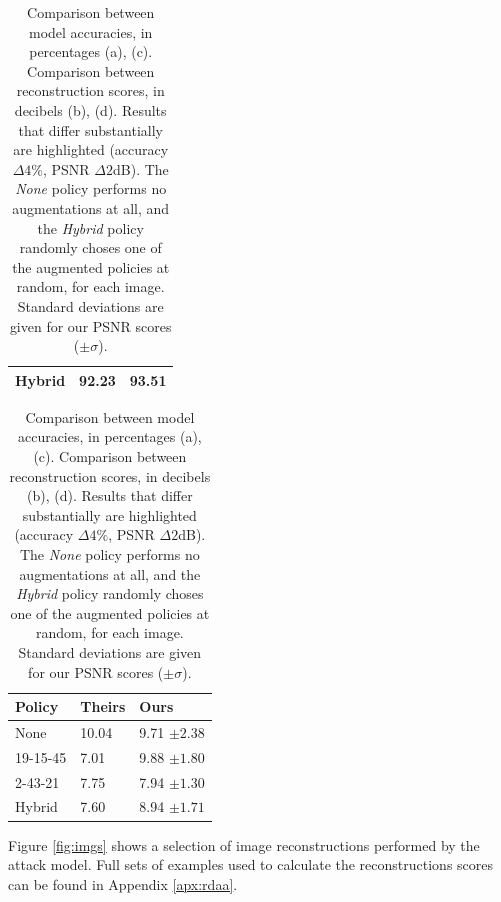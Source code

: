 \begin{table}[h]
\begin{subtable}{.50\linewidth}
{\begin{tabular}{|l|l l |}
             Hybrid          & 92.23           & 93.51         \\
             \hline
        \end{tabular}}
        \caption{Accuracy, F-Mnist}\label{tab:1b}
    \end{subtable}
    \hfill
    \begin{subtable}{.50\linewidth}
        \centering
        {\begin{tabular}{|l|l l|}
             \hline
             \textbf{Policy} & \textbf{Theirs}  & \textbf{Ours}               \\\hline
             None            & 10.04            & 9.71 $\pm 2.38$             \\
             19-15-45        & \color{red} 7.01 & \color{red}  9.88  $\pm 1.80$   \\
             2-43-21         & 7.75             & 7.94 $\pm  1.30$              \\
             Hybrid          & \color{red} 7.60 & \color{red} 8.94 $\pm 1.71$ \\
             \hline
        \end{tabular}}
        \caption{PSNR, F-Mnist}\label{tab:psnrs}
    \end{subtable}

    \caption{Comparison between model accuracies, in percentages (a), (c). Comparison between reconstruction scores, in decibels (b), (d). Results that differ substantially are highlighted (accuracy $\Delta 4\%$, PSNR $\Delta 2$dB). The \textit{None} policy performs no augmentations at all, and the \textit{Hybrid} policy randomly choses one of the augmented policies at random, for each image. Standard deviations are given for our PSNR scores ($\pm \sigma$).
    }
    \label{tab:resls}
\end{table}

Figure \ref{fig:imgs} shows a selection of image reconstructions performed by the attack model. Full sets of examples used to calculate the reconstructions scores can be found in Appendix \ref{apx:rdaa}.

